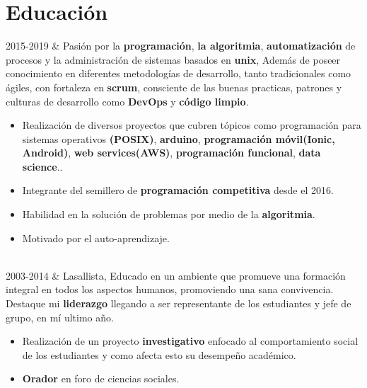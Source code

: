\documentclass[
    changecolor={111, 156, 45}, 
]{cv-roald}
\newcommand{\RomanNumeralCaps}[1]
    {\MakeUppercase{\romannumeral #1}}
\begin{document}
\section*{Educación}
\begin{tabularcv}

2015-2019   &    
                \newline Pasión por la  \textbf{programación}, \textbf{la algoritmia}, \textbf{automatización} de procesos y la administración de sistemas basados en \textbf{unix}, Además de poseer conocimiento en diferentes metodologías de desarrollo, tanto tradicionales como ágiles,  con fortaleza en \textbf{scrum}, consciente de las buenas practicas, patrones y culturas de desarrollo como \textbf{DevOps} y \textbf{código limpio}.
                \begin{itemize}
				  \item Realización de diversos proyectos que cubren tópicos como programación para sistemas operativos \textbf{(POSIX)}, \textbf{arduino}, \textbf{programación móvil(Ionic, Android)},  \textbf{web services(AWS)}, \textbf{programación funcional}, \textbf{data science}..
				  \item Integrante del semillero de \textbf{programación competitiva} desde el 2016.
				  \item  Habilidad en la solución de problemas por medio de la \textbf{algoritmia}.
				  \item Motivado por el auto-aprendizaje.  
                \end{itemize}
                \\
                
2003-2014   &     
                \newline Lasallista, Educado en un ambiente que promueve una formación integral en todos los aspectos humanos, promoviendo una sana convivencia. Destaque mi \textbf{liderazgo} llegando a ser representante de los estudiantes y jefe de grupo, en mí ultimo año. 
                \begin{itemize}
				  \item Realización de un proyecto \textbf{investigativo} enfocado al comportamiento social de los estudiantes y como afecta esto su desempeño académico.
                  \item \textbf{Orador} en \RomanNumeralCaps{2} foro de ciencias sociales.
                \end{itemize} 

                
\end{tabularcv}
\end{document}
